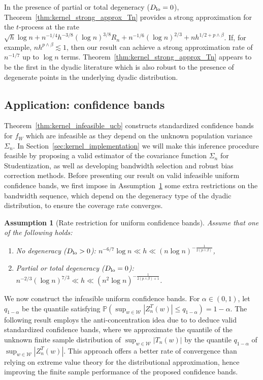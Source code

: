 \documentclass[11pt,lof]{puthesis}
\renewcommand{\P}{\ensuremath{\mathbb{P}}}
\newcommand{\cW}{\ensuremath{\mathcal{W}}}
\newcommand{\Dl}{\ensuremath{D_{\textup{lo}}}}
\theoremstyle{break}
\newtheorem{assumption}{Assumption}[section]
\theoremstyle{proof}
\begin{document}
In the presence of partial or total degeneracy ($\Dl =0$),
Theorem~\ref{thm:kernel_strong_approx_Tn} provides a strong approximation for
the
$t$-process at the rate
$\sqrt{h}\log n + n^{-1/4}h^{-3/8}(\log n)^{3/8} R_n + n^{-1/6}(\log n)^{2/3}
+ n h^{1/2+p\wedge\beta}$. If, for example, $n h^{p\wedge\beta}\lesssim 1$,
then our result can achieve a strong approximation rate of $n^{-1/7}$ up to
$\log n $ terms. Theorem~\ref{thm:kernel_strong_approx_Tn} appears to be the
first in the dyadic literature which is also robust to the presence of
degenerate points in the underlying dyadic distribution.

\subsection{Application: confidence bands}

Theorem~\ref{thm:kernel_infeasible_ucb} constructs standardized confidence
bands for
$f_W$ which are infeasible as they depend on the unknown population variance
$\Sigma_n$. In Section~\ref{sec:kernel_implementation} we will make this
inference
procedure feasible by proposing a valid estimator of the covariance function
$\Sigma_n$ for Studentization, as well as developing bandwidth selection and
robust bias correction methods. Before presenting our result on valid
infeasible uniform confidence bands, we first impose in
Assumption~\ref{ass:kernel_rates} some extra restrictions on the bandwidth
sequence,
which depend on the degeneracy type of the dyadic distribution, to ensure the
coverage rate converges.

\begin{assumption}[Rate restriction for uniform confidence bands]
\label{ass:kernel_rates}
Assume that one of the following holds:
%
\begin{enumerate}[label=(\roman*)]

\item
\label{it:kernel_rate_non}
No degeneracy ($\Dl > 0$):
$n^{-6/7} \log n \ll h \ll (n \log n)^{-\frac{1}{2(p \wedge \beta)}}$,

\item
\label{it:kernel_rate_degen}
Partial or total degeneracy ($\Dl = 0$):
$n^{-2/3} (\log n)^{7/3} \ll h
\ll (n^2 \log n)^{-\frac{1}{2(p \wedge \beta) + 1}}$.
\end{enumerate}
\end{assumption}

We now construct the infeasible uniform confidence bands.
For $\alpha \in (0,1)$, let $q_{1-\alpha}$ be the quantile satisfying
$ \P\left(\sup_{w \in \cW} \left| Z_n^T(w) \right| \leq q_{1-\alpha} \right)
= 1 - \alpha$.
The following result employs the anti-concentration idea due to
\citet{chernozhukov2014anti} to deduce valid standardized confidence bands,
where we approximate the quantile of the unknown finite sample distribution of
$\sup_{w\in\cW} |T_n(w)|$ by the quantile $q_{1-\alpha}$ of
$\sup_{w\in\cW}|Z_n^T(w)|$. This approach offers a better rate of convergence
than relying on extreme value theory for the distributional approximation,
hence improving the finite sample performance of the proposed confidence bands.
\end{document}
